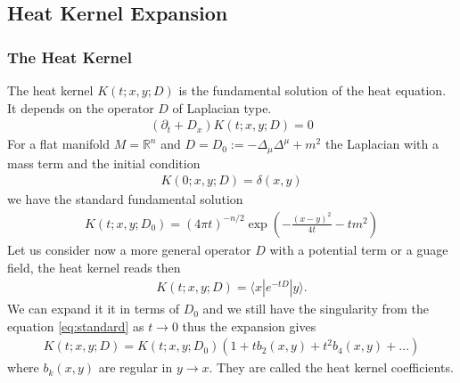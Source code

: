
\subsection{Heat Kernel Expansion}
\subsubsection{The Heat Kernel}
The heat kernel $K(t; x, y; D)$ is the fundamental solution of the heat
equation. It depends on the operator $D$ of Laplacian type.
\begin{align}
    (\partial _t + D_x)K(t;x, y;D) =0
\end{align}
For a flat manifold $M = \mathbb{R}^n$ and $D = D_0 := -\Delta_\mu\Delta^\mu +m^2$ the
Laplacian with a mass term and the initial condition
\begin{align}
    K(0;x,y;D) = \delta(x,y)
\end{align}
we have the standard fundamental solution
\begin{align}\label{eq:standard}
    K(t;x,y;D_0) = (4\pi t)^{-n/2}\exp\left(-\frac{(x-y)^2}{4t}-tm^2\right)
\end{align}
Let us consider now a more general operator $D$ with a potential term or a
guage field, the heat kernel reads then
\begin{align}
    K(t;x,y;D) = \langle x|e^{-tD}|y\rangle.
\end{align}
We can expand it it in terms of $D_0$ and we still have the
singularity from the equation \ref{eq:standard} as $t\rightarrow 0$ thus the
expansion gives
\begin{align}
    K(t;x,y;D) = K(t;x,y;D_0)\left(1 + tb_2(x,y) + t^2b_4(x,y) + \dots \right)
\end{align}
where $b_k(x,y)$ are regular in $y \rightarrow x$. They are called the heat
kernel coefficients.

